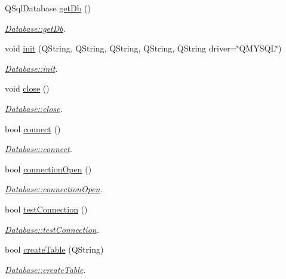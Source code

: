 \begin{DoxyCompactItemize}
\item 
Q\+Sql\+Database \hyperlink{class_database_a2925e696474bdfc43a46f7142e2975ea}{get\+Db} ()
\begin{DoxyCompactList}\small\item\em \hyperlink{class_database_a2925e696474bdfc43a46f7142e2975ea}{Database\+::get\+Db}. \end{DoxyCompactList}\item 
void \hyperlink{class_database_ad0447f050ca5dc97360d3fda62736d4d}{init} (Q\+String, Q\+String, Q\+String, Q\+String, Q\+String driver=\char`\"{}Q\+M\+Y\+S\+Q\+L\char`\"{})
\begin{DoxyCompactList}\small\item\em \hyperlink{class_database_ad0447f050ca5dc97360d3fda62736d4d}{Database\+::init}. \end{DoxyCompactList}\item 
void \hyperlink{class_database_ab89cb07242f0ab1d4058974bf3e7cf19}{close} ()
\begin{DoxyCompactList}\small\item\em \hyperlink{class_database_ab89cb07242f0ab1d4058974bf3e7cf19}{Database\+::close}. \end{DoxyCompactList}\item 
bool \hyperlink{class_database_ad781c19d9df89124b0d1a35d33391b75}{connect} ()
\begin{DoxyCompactList}\small\item\em \hyperlink{class_database_ad781c19d9df89124b0d1a35d33391b75}{Database\+::connect}. \end{DoxyCompactList}\item 
bool \hyperlink{class_database_aff8b507168f3db678fed64344ae5c12e}{connection\+Open} ()
\begin{DoxyCompactList}\small\item\em \hyperlink{class_database_aff8b507168f3db678fed64344ae5c12e}{Database\+::connection\+Open}. \end{DoxyCompactList}\item 
bool \hyperlink{class_database_a16e3a424915bed9bd3abd862882a103e}{test\+Connection} ()
\begin{DoxyCompactList}\small\item\em \hyperlink{class_database_a16e3a424915bed9bd3abd862882a103e}{Database\+::test\+Connection}. \end{DoxyCompactList}\item 
bool \hyperlink{class_database_a416c55ad768fa9243de088a6ea9c1e57}{create\+Table} (Q\+String)
\begin{DoxyCompactList}\small\item\em \hyperlink{class_database_a416c55ad768fa9243de088a6ea9c1e57}{Database\+::create\+Table}. \end{DoxyCompactList}\item 

\end{DoxyCompactItemize}
